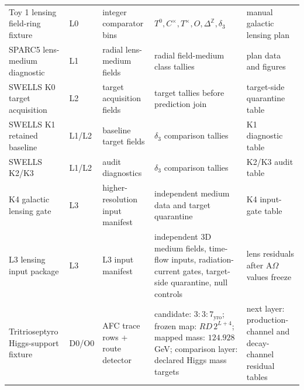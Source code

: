 \begin{longtable}{@{}p{}p{}p{}p{}p{}@{}}
Toy 1 lensing field-ring fixture & L0 & integer comparator bins & \(T^0,C^\times,T^\times,O,\Delta^{\mathbb Z},\delta_3\) & manual galactic lensing plan\\
SPARC5 lens-medium diagnostic & L1 & radial lens-medium fields & radial field-medium class tallies & plan data and figures\\
SWELLS K0 target acquisition & L2 & target acquisition fields & target tallies before prediction join & target-side quarantine table\\
SWELLS K1 retained baseline & L1/L2 & baseline target fields & \(\delta_3\) comparison tallies & K1 diagnostic table\\
SWELLS K2/K3 & L1/L2 & audit diagnostics & \(\delta_3\) comparison tallies & K2/K3 audit table\\
K4 galactic lensing gate & L3 & higher-resolution input manifest & independent medium data and target quarantine & K4 input-gate table\\
L3 lensing input package & L3 & L3 input manifest & independent 3D medium fields, time-flow inputs, radiation-current gates, target-side quarantine, null controls & lens residuals after A\(\Omega\) values freeze\\
Tritrioseptyro Higgs-support fixture & D0/O0 & AFC trace rows + route detector & candidate: $3{:}3{:}7_{\mathrm{yro}}$; frozen map: $RD\,2^{L+4}$; mapped mass: $124.928$ GeV; comparison layer: declared Higgs mass targets & next layer: production-channel and decay-channel residual tables\\
\bottomrule
\end{longtable}
\normalsize

